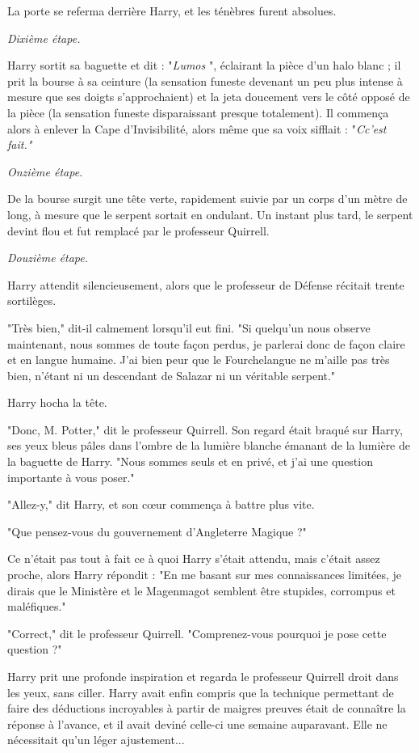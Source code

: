 La porte se referma derrière Harry, et les ténèbres furent absolues.

\emph{Dixième étape.} 

Harry sortit sa baguette et dit : "\emph{Lumos} ", éclairant la pièce d'un halo blanc ; il prit la bourse à sa ceinture (la sensation funeste devenant un peu plus intense à mesure que ses doigts s'approchaient) et la jeta doucement vers le côté opposé de la pièce (la sensation funeste disparaissant presque totalement). Il commença alors à enlever la Cape d'Invisibilité, alors même que sa voix sifflait : "\emph{Cc'est fait."} 

\emph{Onzième étape.} 

De la bourse surgit une tête verte, rapidement suivie par un corps d'un mètre de long, à mesure que le serpent sortait en ondulant. Un instant plus tard, le serpent devint flou et fut remplacé par le professeur Quirrell.

\emph{Douzième étape.} 

Harry attendit silencieusement, alors que le professeur de Défense récitait trente sortilèges.

"Très bien," dit-il calmement lorsqu'il eut fini. "Si quelqu'un nous observe maintenant, nous sommes de toute façon perdus, je parlerai donc de façon claire et en langue humaine. J'ai bien peur que le Fourchelangue ne m'aille pas très bien, n'étant ni un descendant de Salazar ni un véritable serpent."

Harry hocha la tête.

"Donc, M. Potter," dit le professeur Quirrell. Son regard était braqué sur Harry, ses yeux bleus pâles dans l'ombre de la lumière blanche émanant de la lumière de la baguette de Harry. "Nous sommes seuls et en privé, et j'ai une question importante à vous poser."

"Allez-y," dit Harry, et son cœur commença à battre plus vite.

"Que pensez-vous du gouvernement d'Angleterre Magique ?"

Ce n'était pas tout à fait ce à quoi Harry s'était attendu, mais c'était assez proche, alors Harry répondit : "En me basant sur mes connaissances limitées, je dirais que le Ministère et le Magenmagot semblent être stupides, corrompus et maléfiques."

"Correct," dit le professeur Quirrell. "Comprenez-vous pourquoi je pose cette question ?"

Harry prit une profonde inspiration et regarda le professeur Quirrell droit dans les yeux, sans ciller. Harry avait enfin compris que la technique permettant de faire des déductions incroyables à partir de maigres preuves était de connaître la réponse à l'avance, et il avait deviné celle-ci une semaine auparavant. Elle ne nécessitait qu'un léger ajustement...

